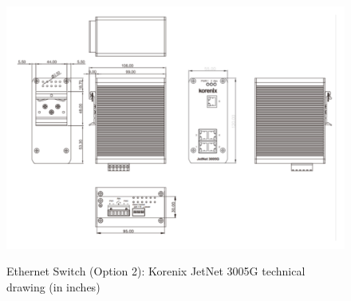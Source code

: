 \begin{figure}
  \centering
  \includegraphics[angle=90,width=1\columnwidth]{figs/body02/FIGDEVICESWITCHOPTION2DRAWING.pdf}\\
  \caption[Ethernet Switch (Option 2): Korenix JetNet 3005G technical drawing (in inches)]{Ethernet Switch (Option 2): Korenix JetNet 3005G technical drawing (in inches)}
  \label{FIG:DEVICESWITCHOPTION2DRAWING}
\end{figure}


